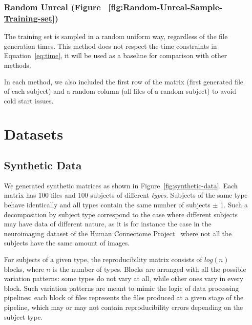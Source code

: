 \documentclass[10pt, conference, compsocconf]{IEEEtran}
\begin{document}
\subsubsection{Random Unreal (Figure 
~\ref{fig:Random-Unreal-Sample-Training-set})} The training set is 
sampled in a random uniform way, regardless of the file generation 
times. This method does not respect the time constraints in 
Equation~\ref{eq:time}, it will be used as a baseline for comparison 
with other methods.

In each method, we also included the first row of the matrix (first 
generated file of each subject) and a random column (all files of a 
random subject) to avoid cold start issues. 


\section{Datasets}

\label{sec:datasets}

\subsection{Synthetic Data}

We generated synthetic matrices as shown in 
Figure~\ref{fig:synthetic-data}. Each matrix has 100 files and 100 
subjects of different \emph{types}. Subjects of the same type behave 
identically and all types contain the same number of subjects $\pm$ 1. 
Such a decomposition by subject type correspond to the case where 
different subjects may have data of different nature, as it is for 
instance the case in the neuroimaging 
dataset of the Human Connectome Project~\cite{van2013wu} where not all the 
subjects have the same amount of images.

 For subjects of a given type, the reproducibility matrix consists of 
 $log(n)$  blocks, where $n$ is the number of types. Blocks are 
 arranged with all the possible variation patterns: some types do not 
 vary at all, while other ones vary in every block. Such variation 
 patterns are meant to mimic the logic of data 
processing pipelines: each block of files represents the files produced 
at a given stage of the pipeline, which may or may not contain 
reproducibility errors depending on the subject type.
\end{document}
